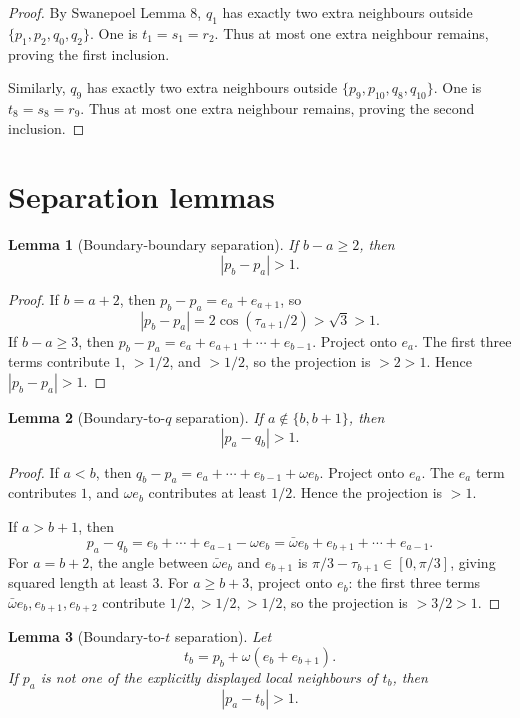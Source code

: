 \documentclass[11pt]{article}
\newtheorem{lemma}{Lemma}
\begin{document}
\begin{proof}
By Swanepoel Lemma 8, $q_1$ has exactly two extra neighbours outside $\{p_1,p_2,q_0,q_2\}$. One is $t_1=s_1=r_2$. Thus at most one extra neighbour remains, proving the first inclusion.

Similarly, $q_9$ has exactly two extra neighbours outside $\{p_9,p_{10},q_8,q_{10}\}$. One is $t_8=s_8=r_9$. Thus at most one extra neighbour remains, proving the second inclusion.
\end{proof}

\section{Separation lemmas}

\begin{lemma}[Boundary-boundary separation]\label{lem:bb-sep}
If $b-a\ge2$, then
\[
  |p_b-p_a|>1.
\]
\end{lemma}

\begin{proof}
If $b=a+2$, then $p_b-p_a=e_a+e_{a+1}$, so
\[
  |p_b-p_a|=2\cos(\tau_{a+1}/2)>\sqrt3>1.
\]
If $b-a\ge3$, then $p_b-p_a=e_a+e_{a+1}+\cdots+e_{b-1}$. Project onto $e_a$. The first three terms contribute $1$, $>1/2$, and $>1/2$, so the projection is $>2>1$. Hence $|p_b-p_a|>1$.
\end{proof}

\begin{lemma}[Boundary-to-$q$ separation]\label{lem:bq-sep}
If $a\notin\{b,b+1\}$, then
\[
  |p_a-q_b|>1.
\]
\end{lemma}

\begin{proof}
If $a<b$, then $q_b-p_a=e_a+\cdots+e_{b-1}+\omega e_b$. Project onto $e_a$. The $e_a$ term contributes $1$, and $\omega e_b$ contributes at least $1/2$. Hence the projection is $>1$.

If $a>b+1$, then
\[
  p_a-q_b=e_b+\cdots+e_{a-1}-\omega e_b=\bar\omega e_b+e_{b+1}+\cdots+e_{a-1}.
\]
For $a=b+2$, the angle between $\bar\omega e_b$ and $e_{b+1}$ is $\pi/3-\tau_{b+1}\in[0,\pi/3]$, giving squared length at least $3$. For $a\ge b+3$, project onto $e_b$: the first three terms $\bar\omega e_b,e_{b+1},e_{b+2}$ contribute $1/2,>1/2,>1/2$, so the projection is $>3/2>1$.
\end{proof}

\begin{lemma}[Boundary-to-$t$ separation]\label{lem:bt-sep}
Let
\[
  t_b=p_b+\omega(e_b+e_{b+1}).
\]
If $p_a$ is not one of the explicitly displayed local neighbours of $t_b$, then
\[
  |p_a-t_b|>1.
\]
\end{lemma}
\end{document}
